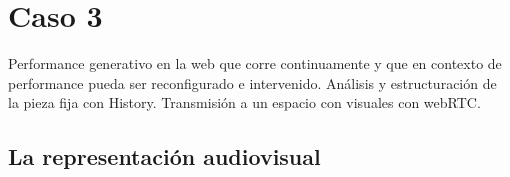 \chapter{Caso 3}


Performance generativo en la web que corre continuamente y que en contexto de performance pueda ser reconfigurado e intervenido.
Análisis y estructuración de la pieza fija con History. Transmisión a un espacio con visuales con webRTC.

\section{La representación audiovisual}

